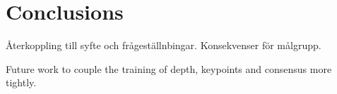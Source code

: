 \chapter{Conclusions}\label{cha:conclusions}

Återkoppling till syfte och frågeställnbingar. Konsekvenser för målgrupp.

Future work to couple the training of depth, keypoints and consensus more tightly.
